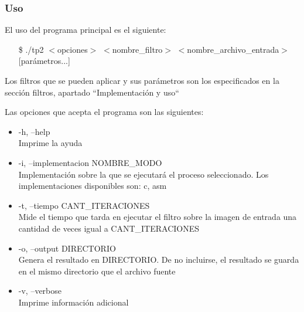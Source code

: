 \documentclass[a4paper, 12pt]{article}
\newcommand{\code}[1]{{\sffamily #1}\xspace}
\begin{document}
\subsubsection*{Uso}

\vspace*{0.2cm}
\noindent El uso del programa principal es el siguiente:
\vspace*{-0.2cm}
\begin{itemize}
    \item [\code{\$}]
        \code{./tp2 $<$opciones$>$ $<$nombre\_filtro$>$
              $<$nombre\_archivo\_entrada$>$ [parámetros...]}
\end{itemize}


Los filtros que se pueden aplicar y sus parámetros son
los especificados en la sección filtros, apartado
``Implementación y uso``


Las opciones que acepta el programa son las siguientes:
\begin{itemize}
  \itemsep0em
  \item \code{-h, --help} \\
  \indent Imprime la ayuda

  \item \code{-i, --implementacion NOMBRE\_MODO} \\
  \indent Implementación sobre la que se ejecutará el proceso
    seleccionado. Los implementaciones disponibles son: c, asm

  \item \code{-t, --tiempo CANT\_ITERACIONES} \\
  \indent Mide el tiempo que tarda en ejecutar el filtro sobre la
    imagen de entrada una cantidad de veces igual a CANT\_ITERACIONES


  \item \code{-o, --output DIRECTORIO} \\
  \indent Genera el resultado en DIRECTORIO.
    De no incluirse, el resultado se guarda en el mismo directorio
    que el archivo fuente

  \item \code{-v, --verbose} \\
  \indent Imprime información adicional


\end{itemize}
\end{document}
